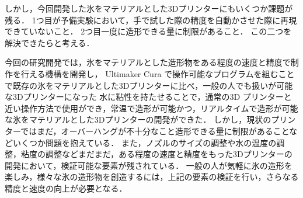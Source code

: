 しかし，今回開発した氷をマテリアルとした3Dプリンターにもいくつか課題が残る．
1つ目が予備実験において，手で試した際の精度を自動かさせた際に再現できていないこと．
2つ目一度に造形できる量に制限があること．
この二つを解決できたらと考える．

今回の研究開発では，氷をマテリアルとした造形物をある程度の速度と精度で制作を行える機構を開発し， Ultimaker Cura で操作可能なプログラムを組むことで既存の氷をマテリアルとした3Dプリンターに比べ，一般の人でも扱いが可能な3Dプリンターになった
水に粘性を持たせることで，通常の3D プリンターと近い操作方法で使用ができ，常温で造形が可能かつ，リアルタイムで造形が可能な氷をマテリアルとした3Dプリンターの開発ができた．
しかし，現状のプリンターではまだ，オーバーハングが不十分なこと造形できる量に制限があることなどいくつか問題を抱えている．
また，ノズルのサイズの調整や水の温度の調整，粘度の調整などまだまだ，ある程度の速度と精度をもった3Dプリンターの開発において，検証可能な要素が残されている．
一般の人が気軽に氷の造形を楽しみ，様々な氷の造形物を創造するには，上記の要素の検証を行い，さらなる精度と速度の向上が必要となる．









